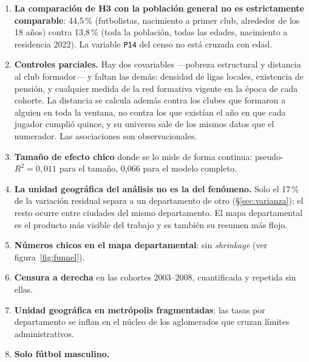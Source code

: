 \documentclass[11pt,a4paper]{article}
\begin{document}
\begin{enumerate}[leftmargin=1.6em,itemsep=0.3em]
    Lo que hace de esto un sesgo y no solo ruido es su dirección. Cuando el
    primer registro es tardío, es mucho más probable que sea del exterior: el
    club registrado está en Argentina en el 91\,\% de los casos si el vínculo
    empieza antes de los 19, y en el 29\,\% si empieza después de los 25.
    Wikidata anota la salida al exterior y se saltea el debut local. El caso que
    lo ilustra: un futbolista nacido en 1985 cuyo primer club registrado es un
    equipo mexicano en 2006, a los 21 años, sin ningún club argentino cargado
    antes —había debutado en Instituto—. La ficha de Wikipedia, en ese caso, sí
    dice «Instituto». Es el tipo de error que la segunda fuente corrige, pero no
    hay garantía de que lo corrija siempre.
  \item \textbf{La comparación de H3 con la población general no es estrictamente
    comparable}: 44,5\,\% (futbolistas, nacimiento a primer club, alrededor de
    los 18 años) contra 13,8\,\% (toda la población, todas las edades, nacimiento
    a residencia 2022). La variable \texttt{P14} del censo no está cruzada con
    edad.
  \item \textbf{Controles parciales.} Hay dos covariables —pobreza estructural y
    distancia al club formador— y faltan las demás: densidad de ligas locales,
    existencia de pensión, y cualquier medida de la red formativa vigente en la
    época de cada cohorte. La distancia se calcula además contra los clubes que
    formaron a alguien en toda la ventana, no contra los que existían el año en
    que cada jugador cumplió quince, y su universo sale de los mismos datos que
    el numerador. Las asociaciones son observacionales.
  \item \textbf{Tamaño de efecto chico} donde se lo mide de forma continua:
    pseudo-$R^2 = 0{,}011$ para el tamaño, 0,066 para el modelo completo.
  \item \textbf{La unidad geográfica del análisis no es la del fenómeno.} Solo el
    17\,\% de la variación residual separa a un departamento de otro
    (§\ref{sec:varianza}); el resto ocurre entre ciudades del mismo departamento.
    El mapa departamental es el producto más visible del trabajo y es también su
    resumen más flojo.
  \item \textbf{Números chicos en el mapa departamental}: sin \emph{shrinkage}
    (ver figura~\ref{fig:funnel}).
  \item \textbf{Censura a derecha} en las cohortes 2003--2008, cuantificada y
    repetida sin ellas.
  \item \textbf{Unidad geográfica en metrópolis fragmentadas}: las tasas por
    departamento se inflan en el núcleo de los aglomerados que cruzan límites
    administrativos.
  \item \textbf{Solo fútbol masculino.}
\end{enumerate}
\end{document}
